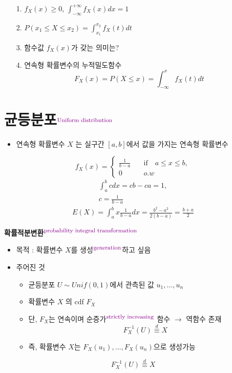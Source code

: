 \documentclass{oblivoir}
\newcommand{\DC}[1]{\textcolor{DarkMagenta}{#1}}%
\newcommand{\UP}[1]{$^{\mbox{\DC{\footnotesize #1}}}$}
\begin{document}
\begin{itemize}
\item[1.] $f_X(x) \geq 0$, $\int_{-\infty}^{+\infty} f_X(x) dx = 1$
\item[2.] $P(x_1 \leq X \leq x_2) = \int_{x_1}^{x_2} f_X(t)dt$
\item[3.] 함수값 $f_X(x)$가 갖는 의미는?
\item[4.] 연속형 확률변수의 누적밀도함수
$$
F_X(x) = P(X \leq x) = \int_{-\infty}^x f_X(t)dt
$$
\end{itemize}

\section{균등분포\UP{Uniform distribution}}
\begin{itemize}
\item 연속형 확률변수 $X$ 는 실구간 $[a,b]$에서 값을 가지는 연속형 확률변수
\end{itemize}
$$
f_X(x) = 
\begin{cases}
\frac{1}{b-a} \quad &\mbox{if} \quad a\leq x \leq b, \\
0 &o.w
\end{cases}
$$
\begin{align*}
\int_a^b c dx = cb - ca = 1, \\
c = \frac{1}{b-a}
\end{align*}
\begin{align*}
E(X) = \int_a^b x \frac{1}{b-a} dx = \frac{b^2 - a^2}{2(b-a)} = \frac{b+a}{2}
\end{align*}

\textbf{확률적분변환\UP{probability integral transformation}}
\begin{itemize}
\item 목적 : 확률변수 $X$를 생성\UP{generation}하고 싶음
\item 주어진 것
\begin{itemize}
\item 균등분포 $U \sim Unif(0,1)$에서 관측된 값 $u_1,\ldots,u_n$
\item 확률변수 $X$ 의 cdf $F_X$
\item 단, $F_X$는 연속이며 순증가\UP{strictly increasing} 함수 $\rightarrow$ 역함수 존재
$$
F^{-1}_X(U) \overset{d}{\equiv} X
$$
\item 즉, 확률변수 $X$는 $F_X(u_1),\ldots,F_X(u_n)$으로 생성가능
\end{itemize}
\end{itemize}
$$
F^{-1}_X(U) \overset{d}{\equiv} X
$$
\end{document}
